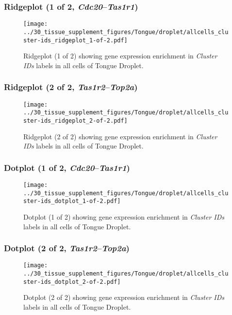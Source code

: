 \clearpage

\subsubsection{Ridgeplot (1 of 2, \emph{Cdc20}--\emph{Tas1r1})}
\begin{figure}[h]
\centering
\texttt{[image: ../30\_tissue\_supplement\_figures/Tongue/droplet/allcells\_cluster-ids\_ridgeplot\_1-of-2.pdf]}

\caption{ Ridgeplot (1 of 2)  showing gene expression enrichment in \emph{Cluster IDs} labels in all cells of Tongue Droplet. }
\end{figure}


\clearpage

\subsubsection{Ridgeplot (2 of 2, \emph{Tas1r2}--\emph{Top2a})}
\begin{figure}[h]
\centering
\texttt{[image: ../30\_tissue\_supplement\_figures/Tongue/droplet/allcells\_cluster-ids\_ridgeplot\_2-of-2.pdf]}

\caption{ Ridgeplot (2 of 2)  showing gene expression enrichment in \emph{Cluster IDs} labels in all cells of Tongue Droplet. }
\end{figure}


\clearpage

\subsubsection{Dotplot (1 of 2, \emph{Cdc20}--\emph{Tas1r1})}
\begin{figure}[h]
\centering
\texttt{[image: ../30\_tissue\_supplement\_figures/Tongue/droplet/allcells\_cluster-ids\_dotplot\_1-of-2.pdf]}

\caption{ Dotplot (1 of 2)  showing gene expression enrichment in \emph{Cluster IDs} labels in all cells of Tongue Droplet. }
\end{figure}


\clearpage

\subsubsection{Dotplot (2 of 2, \emph{Tas1r2}--\emph{Top2a})}
\begin{figure}[h]
\centering
\texttt{[image: ../30\_tissue\_supplement\_figures/Tongue/droplet/allcells\_cluster-ids\_dotplot\_2-of-2.pdf]}

\caption{ Dotplot (2 of 2)  showing gene expression enrichment in \emph{Cluster IDs} labels in all cells of Tongue Droplet. }
\end{figure}


